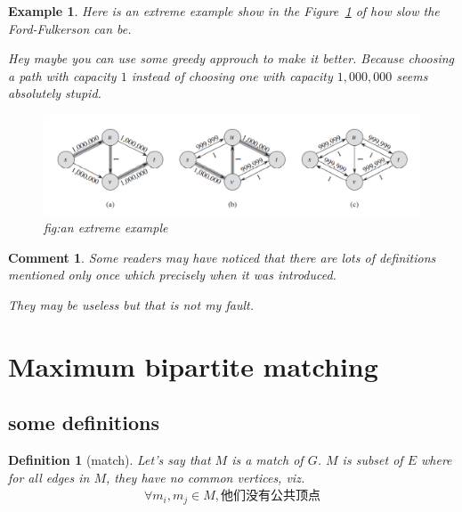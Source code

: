\documentclass[a4paper, 10pt]{ctexart} %
\newtheorem{example}{Example}
\newtheorem{definition}{Definition}
\newtheorem{corollary}{Comment}
\begin{document}
\begin{example}
Here is an extreme example show in the Figure~\ref{fig:mf3} of how slow the Ford-Fulkerson can be.

Hey maybe you can use some greedy approuch to 
make it better. Because choosing a path with capacity $1$ instead of 
choosing one with capacity $1,000,000$ seems 
absolutely stupid.
\begin{figure}[]
    \centering
    \includegraphics[scale = 0.5]{mf3.png}
    \caption{fig:an extreme example}
    \label{fig:mf3}
\end{figure}
\end{example}
\begin{corollary}
Some readers may have noticed that 
there are lots of definitions mentioned only once 
which precisely when 
it was introduced. 

They may be useless but that is not my fault.
\end{corollary}

\section{Maximum bipartite matching}
\subsection{some definitions}
\begin{definition}[match]
Let's say that $M$ is a match of $G$. $M$ 
is subset of $E$ where for all edges in $M$, 
they have no common vertices, viz.
\begin{align*}
    \forall m_{i},m_{j} \in M, \text{他们没有公共顶点}
\end{align*}
\end{definition}
\end{document}
